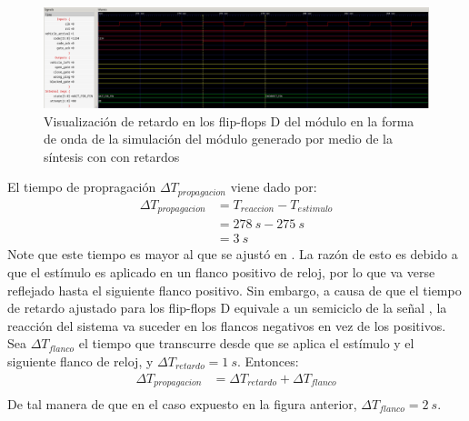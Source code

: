 \begin{figure}[!h]
    \centering
    \includegraphics[width = \linewidth]{figs/retardo.png}
    \caption{Visualización de retardo en los flip-flops D del módulo en la forma de onda de la simulación del módulo generado por medio de la síntesis con  con retardos}
    \label{fig11}
\end{figure}

El tiempo de propragación $\Delta T_{propagacion}$ viene dado por:
\begin{align*}   
    \Delta T_{propagacion}  &= T_{reaccion} - T_{estimulo}\\
                            &= \SI{278}{s} - \SI{275}{s}\\
                            &= \SI{3}{s}
\end{align*}
Note que este tiempo es mayor al que se ajustó en .
La razón de esto es debido a que el estímulo es aplicado en un flanco positivo de reloj, por lo que va verse reflejado hasta el siguiente flanco positivo. 
Sin embargo, a causa de que el tiempo de retardo ajustado para los flip-flops D equivale a un semiciclo de la señal , la reacción del sistema va suceder en los flancos negativos en vez de los positivos. Sea $\Delta T_{flanco}$ el tiempo que transcurre desde que se aplica el estímulo y el siguiente flanco de reloj, y $\Delta T_{retardo} = \SI{1}{s}$. Entonces:
\begin{align*}   
    \Delta T_{propagacion}  &= \Delta T_{retardo} + \Delta T_{flanco}\\
\end{align*}
De tal manera de que en el caso expuesto en la figura anterior, $\Delta T_{flanco} = \SI{2}{s}$.
